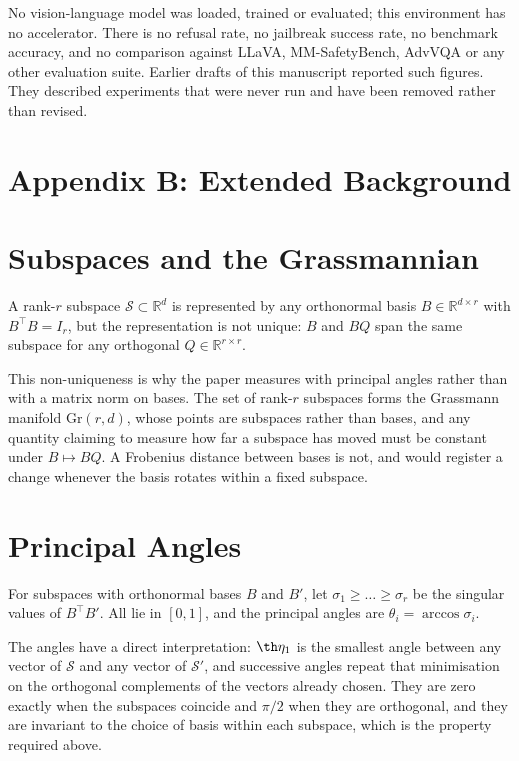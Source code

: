 \documentclass[10pt,twocolumn,letterpaper]{article}
\begin{document}
No vision-language model was loaded, trained or evaluated; this environment has no accelerator. There is no refusal rate, no jailbreak success rate, no benchmark accuracy, and no comparison against LLaVA, MM-SafetyBench, AdvVQA or any other evaluation suite. Earlier drafts of this manuscript reported such figures. They described experiments that were never run and have been removed rather than revised.




\section{Appendix B: Extended Background}



\section{Subspaces and the Grassmannian}


A rank-$r$ subspace $\mathcal{S} \subset \mathbb{R}^{d}$ is represented by any orthonormal basis $B \in \mathbb{R}^{d \times r}$ with $B^{\top}B = I_r$, but the representation is not unique: $B$ and $BQ$ span the same subspace for any orthogonal $Q \in \mathbb{R}^{r \times r}$.

This non-uniqueness is why the paper measures with principal angles rather than with a matrix norm on bases. The set of rank-$r$ subspaces forms the Grassmann manifold $\mathrm{Gr}(r, d)$, whose points are subspaces rather than bases, and any quantity claiming to measure how far a subspace has moved must be constant under $B \mapsto BQ$. A Frobenius distance between bases is not, and would register a change whenever the basis rotates within a fixed subspace.


\section{Principal Angles}


For subspaces with orthonormal bases $B$ and $B'$, let $\sigma_1 \ge \dots \ge \sigma_r$ be the singular values of $B^{\top}B'$. All lie in $[0, 1]$, and the principal angles are $\theta_i = \arccos \sigma_i$.

The angles have a direct interpretation: $\th\eta_1$ is the smallest angle between any vector of $\mathcal{S}$ and any vector of $\mathcal{S}'$, and successive angles repeat that minimisation on the orthogonal complements of the vectors already chosen. They are zero exactly when the subspaces coincide and $\pi/2$ when they are orthogonal, and they are invariant to the choice of basis within each subspace, which is the property required above.
\end{document}
